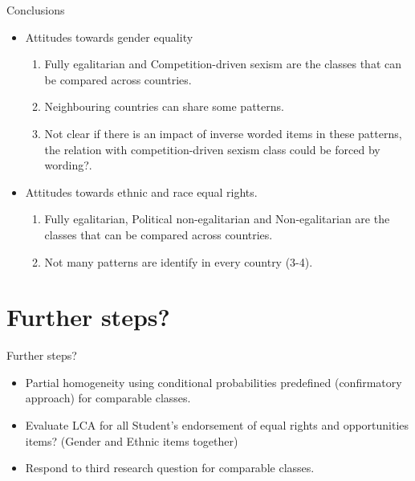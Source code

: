 \documentclass[11pt,t]{beamer}
\begin{document}
\begin{frame}{Conclusions}
\vspace{-2mm} 
\begin{itemize}

\item Attitudes towards gender equality 
\vspace{2mm} 
\begin{enumerate}
\item Fully egalitarian and Competition-driven sexism are the classes that can be compared across countries. 
\vspace{2mm} 
\item Neighbouring countries can share some patterns. 
\vspace{2mm} 
\item Not clear if there is an impact of inverse worded items in these patterns, the relation with competition-driven sexism class could be forced by wording?.
\end{enumerate}
\vspace{2mm} 
\item Attitudes towards ethnic and race equal rights.  
\vspace{2mm} 
\begin{enumerate}
\item Fully egalitarian, Political non-egalitarian and Non-egalitarian are the classes that can be compared across countries. 
\vspace{2mm} 
\item Not many patterns are identify in every country (3-4).
\end{enumerate}
\end{itemize}
\end{frame}

\section{Further steps?}
\begin{frame}{Further steps?}
\begin{itemize}
\vspace{3.1mm} 
\item Partial homogeneity using conditional probabilities predefined (confirmatory approach) for comparable classes.

\vspace{3.1mm} 
\item Evaluate LCA for all Student’s endorsement of equal rights and opportunities items? (Gender and Ethnic items together) 

\vspace{3.1mm} 
\item Respond to third research question for comparable classes.

\end{itemize}

\end{frame}
\end{document}
